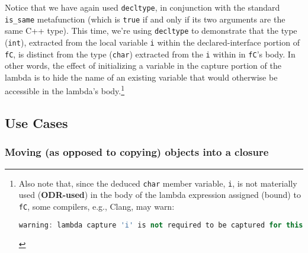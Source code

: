 \noindent Notice that we have again used \texttt{decltype}, in conjunction with
the standard \texttt{is\_same} metafunction (which is \texttt{true} if
and only if its two arguments are the same C++ type). This time, we're using \texttt{decltype} to
demonstrate that the type (\texttt{int}), extracted from the local
variable \texttt{i} within the declared-interface portion of
\texttt{fC}, is distinct from the type (\texttt{char}) extracted from
the \texttt{i} within in \texttt{fC}'s body. In other words, the effect
of initializing a variable in the capture portion of the lambda is to
hide the name of an existing variable that would otherwise be accessible
in the lambda's body.{\cprotect\footnote{Also note that, since the
deduced \texttt{char} member variable, \texttt{i}, is not materially
used (\textbf{ODR-used}) in the body of the lambda expression assigned
(bound) to \texttt{fC}, some compilers, e.g., Clang, may warn:

\begin{lstlisting}[language=C++, basicstyle={\ttfamily\footnotesize}]
warning: lambda capture 'i' is not required to be captured for this use
\end{lstlisting}
}}

\subsection[Use Cases]{Use Cases}\label{use-cases-lambdacapture}

\subsubsection[Moving (as opposed to copying) objects into a closure]{Moving (as opposed to copying) objects into a closure}\label{moving-(as-opposed-to-copying)-objects-into-a-closure}

